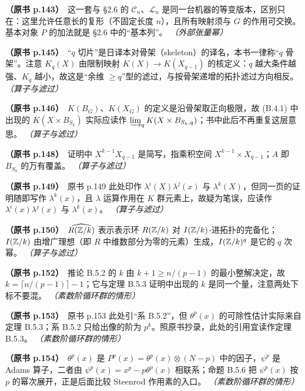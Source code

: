 \noindent \textbf{（原书 p.143）}\ 这一套与 §2.6 的 $\mathcal{C}_n$、$\mathcal{L}_n$ 是同一台机器的等变版本，区别只在：这里允许任意长的复形（不固定长度 $n$），且所有映射须与 $G$ 的作用可交换。基本对象 $P$ 的加法就是 §2.6 中的“基本列”。 \textit{（外部张量幂）}\par\smallskip

\noindent \textbf{（原书 p.145）}\ “$q$ 切片”是日译本对骨架（skeleton）的译名，本书一律称“$q$ 骨架”。注意 $K_q(X)$ 由限制映射 $K(X)\to K(X_{q-1})$ 的核定义：$q$ 越大条件越强、$K_q$ 越小，故这是“余维 $\ge q$”型的滤过，与按骨架递增的拓扑滤过方向相反。 \textit{（算子与滤过）}\par\smallskip

\noindent \textbf{（原书 p.146）}\ $K(B_G)$、$K(X_G)$ 的定义是沿骨架取正向极限，故 (B.4.1) 中出现的 $K(X\times B_{S_k})$ 实际应读作 $\varinjlim_q K(X\times B_{S_k,q})$；书中此后不再重复这层意思。 \textit{（算子与滤过）}\par\smallskip

\noindent \textbf{（原书 p.148）}\ 证明中 $X^{k-1}X_{q-1}$ 是简写，指乘积空间 $X^{k-1}\times X_{q-1}$；$A$ 即 $B_{S_k}$ 的万有覆盖。 \textit{（算子与滤过）}\par\smallskip

\noindent \textbf{（原书 p.149）}\ 原书 p.149 此处印作 $\lambda^i(X)\lambda^j(x)$ 与 $\lambda^k(X)$，但同一页的证明随即写作 $\lambda^k(x)$，且 $\lambda$ 运算作用在 $K$ 群元素上，故疑为笔误，应读作 $\lambda^i(x)\lambda^j(x)$ 与 $\lambda^k(x)$。 \textit{（算子与滤过）}\par\smallskip

\noindent \textbf{（原书 p.150）}\ $\widehat{R(\mathbb{Z}/k)}$ 表示表示环 $R(\mathbb{Z}/k)$ 对 $I(\mathbb{Z}/k)$-进拓扑的完备化；$I(\mathbb{Z}/k)$ 由增广理想（即 $R$ 中维数部分为零的元素）生成，$I(\mathbb{Z}/k)^q$ 是它的 $q$ 次幂。 \textit{（算子与滤过）}\par\smallskip

\noindent \textbf{（原书 p.152）}\ 推论 B.5.2 的 $k$ 由 $k+1\ge n/(p-1)$ 的最小整解决定，故 $k=\lceil n/(p-1)\rceil-1$；它与定理 B.5.3 证明中出现的 $k$ 是同一个量，注意两处下标不要混。 \textit{（素数阶循环群的情形）}\par\smallskip

\noindent \textbf{（原书 p.153）}\ 原书 p.153 此处引“系 B.5.2”，但 $\theta^p(x)$ 的可除性估计实际来自定理 B.5.3；系 B.5.2 只给出像的阶为 $p^k$。照原书抄录，此处的引用宜读作定理 B.5.3。 \textit{（素数阶循环群的情形）}\par\smallskip

\noindent \textbf{（原书 p.154）}\ $\theta^p(x)$ 是 $P^p(x)=\theta^p(x)\otimes(N-p)$ 中的因子，$\psi^p$ 是 Adams 算子，二者由 $\psi^p(x)=x^p-p\theta^p(x)$ 相联系；命题 B.5.6 把 $\psi^p(x)$ 按 $p$ 的幂次展开，正是后面比较 Steenrod 作用素的入口。 \textit{（素数阶循环群的情形）}\par\smallskip

